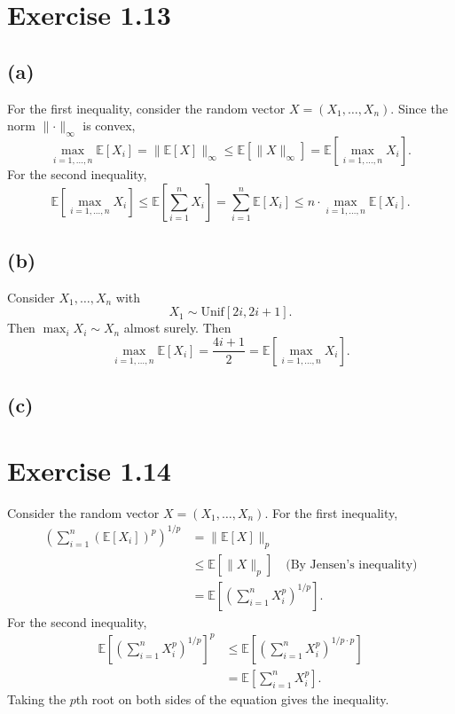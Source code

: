 \newpage
\section*{Exercise 1.13}
\subsection*{(a)}
For the first inequality, consider the random vector $X= (X_1, \dots, X_n)$. Since the norm $\lVert \cdot 
\rVert_{\infty}$ is convex, 
\[ \max_{i = 1, \dots, n}\mathbb{E}\left[ X_i \right] = \lVert \mathbb{E}\left[ X \right] \rVert_{\infty} 
\leq \mathbb{E}\left[ \lVert X \rVert_{\infty} \right] 
= \mathbb{E}\left[ \max_{i= 1, \dots, n} X_i \right]. \]
For the second inequality, 
\[ \mathbb{E}\left[ \max_{i = 1, \dots, n}X_i \right] \leq \mathbb{E}\left[ \sum_{i = 1}^{n}X_i \right] 
= \sum_{i = 1}^{n} \mathbb{E}\left[ X_i \right] \leq n \cdot \max_{i = 1, \dots, n} \mathbb{E}\left[ X_i \right].
\]

\subsection*{(b)}
Consider $X_1, \dots, X_n$ with 
\[ X_1 \sim \mathrm{Unif}[2i, 2i + 1]. \]
Then $\max_{i} X_i \sim X_n$ almost surely. Then 
\[ \max_{i = 1, \dots, n}\mathbb{E}\left[ X_i \right] = \frac{4i + 1}{2} 
= \mathbb{E}\left[ \max_{i = 1, \dots, n}X_i \right]. \]

\subsection*{(c)}




\newpage
\section*{Exercise 1.14}
Consider the random vector $X = (X_1, \dots, X_n)$. For the first inequality, 
\begin{align*}
	\left( \sum_{i = 1}^{n} (\mathbb{E}\left[ X_i \right])^p \right)^{1/p} 
	&= \lVert \mathbb{E}\left[ X \right] \rVert_{p} \\
	&\leq \mathbb{E}\left[ \lVert X \rVert_{p} \right] \quad \text{(By Jensen's inequality)} \\
	&= \mathbb{E}\left[ \left( \sum_{i = 1}^{n} X_i^p \right)^{1/p} \right].
\end{align*}
For the second inequality, 
\begin{align*}
	\mathbb{E}\left[ \left( \sum_{i = 1}^{n} X_i^p \right)^{1/p} \right]^p 
	&\leq \mathbb{E}\left[ \left( \sum_{i = 1}^{n} X_i^p \right)^{1/p \cdot p} \right] \\
	&= \mathbb{E}\left[ \sum_{i = 1}^{n} X_i^p \right].
\end{align*}
Taking the $p$th root on both sides of the equation gives the inequality.


